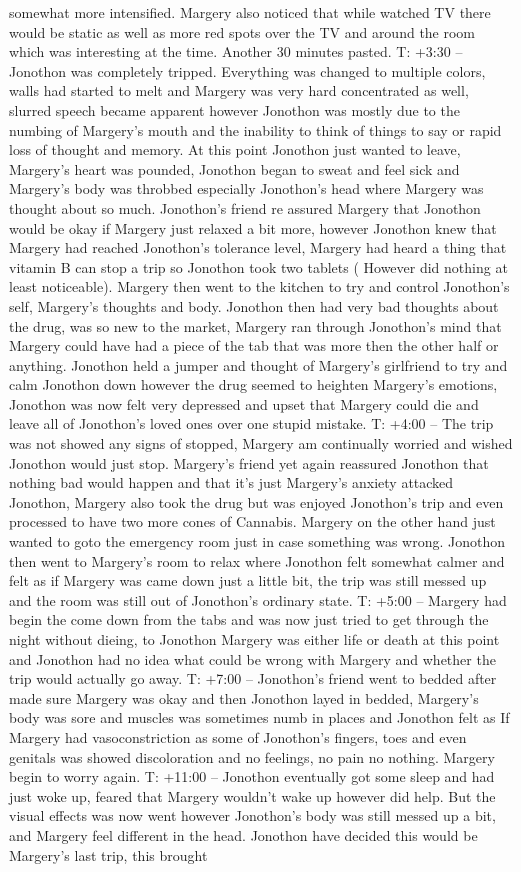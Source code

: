 \documentclass[12pt]{book}
\begin{document}
somewhat more intensified. Margery also noticed that while watched TV there would be static as well as more red spots over the TV and around the room which was interesting at the time. Another 30 minutes pasted. T: +3:30 -- Jonothon was completely tripped. Everything was changed to multiple colors, walls had started to melt and Margery was very hard concentrated as well, slurred speech became apparent however Jonothon was mostly due to the numbing of Margery's mouth and the inability to think of things to say or rapid loss of thought and memory. At this point Jonothon just wanted to leave, Margery's heart was pounded, Jonothon began to sweat and feel sick and Margery's body was throbbed especially Jonothon's head where Margery was thought about so much. Jonothon's friend re assured Margery that Jonothon would be okay if Margery just relaxed a bit more, however Jonothon knew that Margery had reached Jonothon's tolerance level, Margery had heard a thing that vitamin B can stop a trip so Jonothon took two tablets ( However did nothing at least noticeable). Margery then went to the kitchen to try and control Jonothon's self, Margery's thoughts and body. Jonothon then had very bad thoughts about the drug, was so new to the market, Margery ran through Jonothon's mind that Margery could have had a piece of the tab that was more then the other half or anything. Jonothon held a jumper and thought of Margery's girlfriend to try and calm Jonothon down however the drug seemed to heighten Margery's emotions, Jonothon was now felt very depressed and upset that Margery could die and leave all of Jonothon's loved ones over one stupid mistake. T: +4:00 -- The trip was not showed any signs of stopped, Margery am continually worried and wished Jonothon would just stop. Margery's friend yet again reassured Jonothon that nothing bad would happen and that it's just Margery's anxiety attacked Jonothon, Margery also took the drug but was enjoyed Jonothon's trip and even processed to have two more cones of Cannabis. Margery on the other hand just wanted to goto the emergency room just in case something was wrong. Jonothon then went to Margery's room to relax where Jonothon felt somewhat calmer and felt as if Margery was came down just a little bit, the trip was still messed up and the room was still out of Jonothon's ordinary state. T: +5:00 -- Margery had begin the come down from the tabs and was now just tried to get through the night without dieing, to Jonothon Margery was either life or death at this point and Jonothon had no idea what could be wrong with Margery and whether the trip would actually go away. T: +7:00 -- Jonothon's friend went to bedded after made sure Margery was okay and then Jonothon layed in bedded, Margery's body was sore and muscles was sometimes numb in places and Jonothon felt as If Margery had vasoconstriction as some of Jonothon's fingers, toes and even genitals was showed discoloration and no feelings, no pain no nothing. Margery begin to worry again. T: +11:00 -- Jonothon eventually got some sleep and had just woke up, feared that Margery wouldn't wake up however did help. But the visual effects was now went however Jonothon's body was still messed up a bit, and Margery feel different in the head. Jonothon have decided this would be Margery's last trip, this brought 
\end{document}
